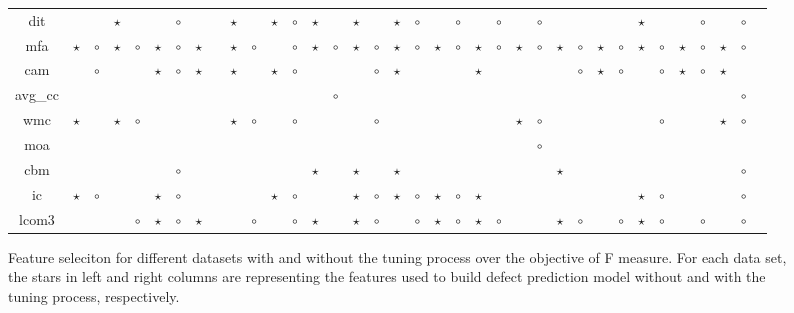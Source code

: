 \begin{figure*}[!ht]
\begin{tabular}{c|c c|c c|c c|c c|c c|c c|c c|c c|c c|c c|c c|c c|c c|c c|c c|c c|c c|c }
dit& & & $\star$& & & $\circ$& & & $\star$& & $\star$& $\circ$& $\star$& & $\star$& & $\star$& $\circ$& & $\circ$& & $\circ$& & $\circ$& & & & & $\star$& & & $\circ$& & $\circ$\\
mfa& $\star$& $\circ$& $\star$& $\circ$& $\star$& $\circ$& $\star$& & $\star$& $\circ$& & $\circ$& $\star$& $\circ$& $\star$& $\circ$& $\star$& $\circ$& $\star$& $\circ$& $\star$& $\circ$& $\star$& $\circ$& $\star$& $\circ$& $\star$& $\circ$& $\star$& $\circ$& $\star$& $\circ$& $\star$& $\circ$\\
cam& & $\circ$& & & $\star$& $\circ$& $\star$& & $\star$& & $\star$& $\circ$& & & & $\circ$& $\star$& & & & $\star$& & & & & $\circ$& $\star$& $\circ$& & $\circ$& $\star$& $\circ$& $\star$& \\
avg\_cc& & & & & & & & & & & & & & $\circ$& & & & & & & & & & & & & & & & & & & & $\circ$\\
wmc& $\star$& & $\star$& $\circ$& & & & & $\star$& $\circ$& & $\circ$& & & & $\circ$& & & & & & & $\star$& $\circ$& & & & & & $\circ$& & & $\star$& $\circ$\\
moa& & & & & & & & & & & & & & & & & & & & & & & & $\circ$& & & & & & & & & & \\
cbm& & & & & & $\circ$& & & & & & & $\star$& & $\star$& & $\star$& & & & & & & & $\star$& & & & & & & & & $\circ$\\
ic& $\star$& $\circ$& & & $\star$& $\circ$& & & & & $\star$& $\circ$& & & $\star$& $\circ$& $\star$& $\circ$& $\star$& $\circ$& $\star$& & & & & & & & $\star$& $\circ$& & & & $\circ$\\
lcom3& & & & $\circ$& $\star$& $\circ$& $\star$& & & $\circ$& & $\circ$& $\star$& & $\star$& $\circ$& & $\circ$& $\star$& $\circ$& $\star$& $\circ$& & & $\star$& $\circ$& & $\circ$& $\star$& $\circ$& & $\circ$& & $\circ$\\

  \end{tabular}
    \caption{Feature seleciton for different datasets with and without the tuning process over the objective of F measure. For each data set, the stars in left and right columns are representing the features used to build defect prediction model without and with the tuning process, respectively.}
\end{figure*}



